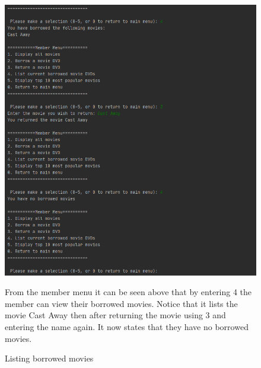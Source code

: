 \documentclass[a4paper,12pt]{article}
\begin{document}
\begin{figure}[!htb]
\centering
\includegraphics[width=1\textwidth]{10}
\caption{Listing borrowed movies}
\medskip
\small
From the member menu it can be seen above that by entering 4 the member can view their borrowed movies. Notice that it lists the movie Cast Away then after returning the movie using 3 and entering the name again. It now states that they have no borrowed movies.
\end{figure}
\end{document}
